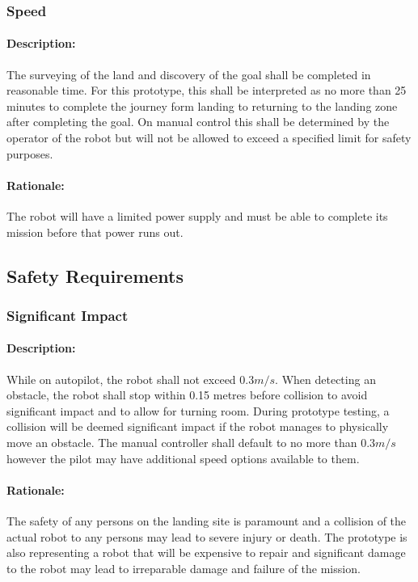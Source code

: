 \documentclass[10pt,a4paper,titlepage]{article}
\begin{document}
	\subsubsection*{Speed}
	\paragraph {Description:} The surveying of the land and discovery of the goal shall be completed in reasonable time. For this prototype, this shall be interpreted as no more than 25 minutes to complete the journey form landing to returning to the landing zone after completing the goal. On manual control this shall be determined by the operator of the robot but will not be allowed to exceed a specified limit for safety purposes.
	\paragraph {Rationale:} The robot will have a limited power supply and must be able to complete its mission before that power runs out. 
	
	\subsection{Safety Requirements}
	\subsubsection*{Significant Impact}
	\paragraph {Description:} While on autopilot, the robot shall not exceed \begin{math}0.3 m/s\end{math}. When detecting an obstacle, the robot shall stop within 0.15 metres before collision to avoid significant impact and to allow for turning room. During prototype testing, a collision will be deemed significant impact if the robot manages to physically move an obstacle. The manual controller shall default to no more than \begin{math}0.3 m/s\end{math} however the pilot may have additional speed options available to them.
	\paragraph {Rationale:}The safety of any persons on the landing site is paramount and a collision of the actual robot to any persons may lead to severe injury or death. The prototype is also representing a robot that will be expensive to repair and significant damage to the robot may lead to irreparable damage and failure of the mission.
	
\end{document}

